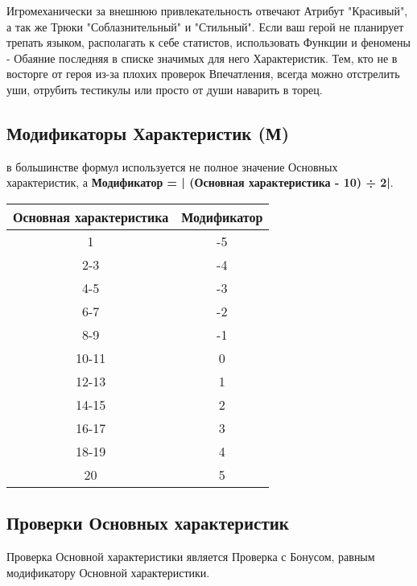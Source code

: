\begin{tcolorbox}
    Игромеханически за внешнюю привлекательность отвечают Атрибут "Красивый", а так же Трюки "Соблазнительный" и "Стильный". 
    \newline Если ваш герой не планирует трепать языком, располагать к себе статистов, использовать Функции и феномены - Обаяние последняя в списке значимых для него Характеристик. Тем, кто не в восторге от героя из-за плохих проверок Впечатления, всегда можно отстрелить уши, отрубить тестикулы или просто от души наварить в торец.
\end{tcolorbox}

\subsection{Модификаторы Характеристик (М)} в большинстве формул используется не полное значение Основных характеристик, а \textbf{Модификатор = | (Основная характеристика - 10) ÷ 2|}.
\begin{center}
\begin{tabular}{ |c|c| }
\hline
\textbf{Основная характеристика} & \textbf{Модификатор}
\\ \hline
1 & -5
\\ \hline
2-3 & -4
\\ \hline
4-5 & -3
\\ \hline
6-7 & -2
\\ \hline
8-9 & -1
\\ \hline
10-11 & 0
\\ \hline
12-13 & 1
\\ \hline
14-15 & 2
\\ \hline
16-17 & 3
\\ \hline
18-19 & 4
\\ \hline
20 & 5
\\ \hline
\end{tabular}
\end{center}
\subsection{Проверки Основных характеристик}
Проверка Основной характеристики является Проверка с Бонусом, равным модификатору Основной характеристики.

